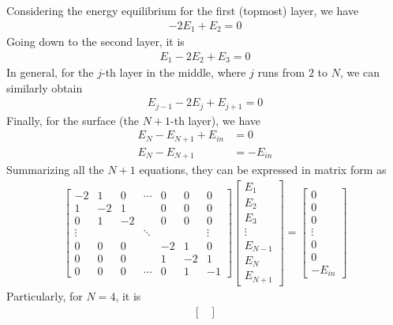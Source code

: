 \begin{solution}
Considering the energy equilibrium for the first (topmost) layer, we have
\begin{align*}
-2E_1 + E_2 = 0 
\end{align*}
Going down to the second layer, it is
\begin{align*}
E_1 - 2E_2 + E_3 = 0
\end{align*}
In general, for the $j$-th layer in the middle, where $j$ runs from $2$ to $N$, we can similarly obtain
\begin{align*}
E_{j-1} - 2E_j + E_{j+1} = 0
\end{align*}
Finally, for the surface (the $N+1$-th layer), we have
\begin{align*}
E_N - E_{N+1} + E_{in} &= 0 \\
E_N - E_{N+1} &= -E_{in} 
\end{align*}
Summarizing all the $N+1$ equations, they can be expressed in matrix form as
\begin{align*}
\begin{bmatrix}
-2 & 1 & 0 & \cdots & 0 & 0 & 0 \\
1 & -2 & 1 & & 0 & 0 & 0 \\
0 & 1 & -2 & & 0 & 0 & 0 \\
\vdots & & & \ddots & & & \vdots \\
0 & 0 & 0 & & -2 & 1 & 0 \\
0 & 0 & 0 & & 1 & -2 & 1 \\
0 & 0 & 0 & \cdots & 0 & 1 & -1
\end{bmatrix}
\begin{bmatrix}
E_1 \\
E_2 \\
E_3 \\
\vdots \\
E_{N-1} \\
E_N \\
E_{N+1}
\end{bmatrix}
=
\begin{bmatrix}
0 \\
0 \\
0 \\
\vdots \\
0 \\
0 \\
-E_{in}
\end{bmatrix}
\end{align*}
Particularly, for $N=4$, it is
\begin{align*}
\begin{bmatrix}

\end{bmatrix}
\end{align*}
\end{solution}
